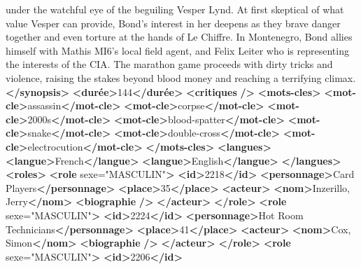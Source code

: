 \documentclass[]{article}
\newenvironment{Shaded}{}{}
\newcommand{\KeywordTok}[1]{\textcolor[rgb]{0.00,0.44,0.13}{\textbf{{#1}}}}
\newcommand{\StringTok}[1]{\textcolor[rgb]{0.25,0.44,0.63}{{#1}}}
\newcommand{\OtherTok}[1]{\textcolor[rgb]{0.00,0.44,0.13}{{#1}}}
\newcommand{\NormalTok}[1]{{#1}}
\begin{document}
\begin{Shaded}
\begin{Highlighting}[]
      {under the watchful eye of the beguiling Vesper Lynd. At first skeptical of what value Vesper}
      {can provide, Bond's interest in her deepens as they brave danger together and even torture}
      {at the hands of Le Chiffre. In Montenegro, Bond allies himself with Mathis MI6's local}
      {field agent, and Felix Leiter who is representing the interests of the CIA. The marathon}
      {game proceeds with dirty tricks and violence, raising the stakes beyond blood money and}
      {reaching a terrifying climax.}\KeywordTok{</synopsis>}
      \KeywordTok{<durée>}\NormalTok{144}\KeywordTok{</durée>}
      \KeywordTok{<critiques} \KeywordTok{/>}
      \KeywordTok{<mots-cles>}
        \KeywordTok{<mot-cle>}\NormalTok{assassin}\KeywordTok{</mot-cle>}
        \KeywordTok{<mot-cle>}\NormalTok{corpse}\KeywordTok{</mot-cle>}
        \KeywordTok{<mot-cle>}\NormalTok{2000s}\KeywordTok{</mot-cle>}
        \KeywordTok{<mot-cle>}\NormalTok{blood-spatter}\KeywordTok{</mot-cle>}
        \KeywordTok{<mot-cle>}\NormalTok{snake}\KeywordTok{</mot-cle>}
        \KeywordTok{<mot-cle>}\NormalTok{double-cross}\KeywordTok{</mot-cle>}
        \KeywordTok{<mot-cle>}\NormalTok{electrocution}\KeywordTok{</mot-cle>}
      \KeywordTok{</mots-cles>}
      \KeywordTok{<langues>}
        \KeywordTok{<langue>}\NormalTok{French}\KeywordTok{</langue>}
        \KeywordTok{<langue>}\NormalTok{English}\KeywordTok{</langue>}
      \KeywordTok{</langues>}
      \KeywordTok{<roles>}
        \KeywordTok{<role}\OtherTok{ sexe=}\StringTok{"MASCULIN"}\KeywordTok{>}
          \KeywordTok{<id>}\NormalTok{2218}\KeywordTok{</id>}
          \KeywordTok{<personnage>}\NormalTok{Card Players}\KeywordTok{</personnage>}
          \KeywordTok{<place>}\NormalTok{35}\KeywordTok{</place>}
          \KeywordTok{<acteur>}
            \KeywordTok{<nom>}\NormalTok{Inzerillo, Jerry}\KeywordTok{</nom>}
            \KeywordTok{<biographie} \KeywordTok{/>}
          \KeywordTok{</acteur>}
        \KeywordTok{</role>}
        \KeywordTok{<role}\OtherTok{ sexe=}\StringTok{"MASCULIN"}\KeywordTok{>}
          \KeywordTok{<id>}\NormalTok{2224}\KeywordTok{</id>}
          \KeywordTok{<personnage>}\NormalTok{Hot Room Technicians}\KeywordTok{</personnage>}
          \KeywordTok{<place>}\NormalTok{41}\KeywordTok{</place>}
          \KeywordTok{<acteur>}
            \KeywordTok{<nom>}\NormalTok{Cox, Simon}\KeywordTok{</nom>}
            \KeywordTok{<biographie} \KeywordTok{/>}
          \KeywordTok{</acteur>}
        \KeywordTok{</role>}
        \KeywordTok{<role}\OtherTok{ sexe=}\StringTok{"MASCULIN"}\KeywordTok{>}
          \KeywordTok{<id>}\NormalTok{2206}\KeywordTok{</id>}

\end{Highlighting}
\end{Shaded}
\end{document}
